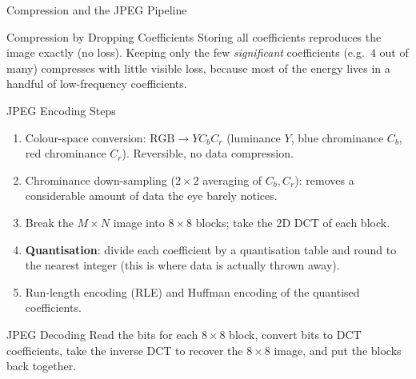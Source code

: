 \documentclass{beamer}
\begin{document}
\begin{frame}[shrink=10]{Compression and the JPEG Pipeline}
  \begin{block}{Compression by Dropping Coefficients}
    Storing all coefficients reproduces the image exactly (no loss). Keeping
    only the few \emph{significant} coefficients (e.g.\ $4$ out of many)
    compresses with little visible loss, because most of the energy lives in
    a handful of low-frequency coefficients.
  \end{block}

  \begin{block}{JPEG Encoding Steps}
    \begin{enumerate}\setlength\itemsep{2pt}
      \item Colour-space conversion: $\text{RGB} \to Y C_b C_r$
            (luminance $Y$, blue chrominance $C_b$, red chrominance $C_r$).
            Reversible, no data compression.
      \item Chrominance down-sampling ($2\times2$ averaging of $C_b, C_r$):
            removes a considerable amount of data the eye barely notices.
      \item Break the $M\times N$ image into $8\times8$ blocks; take the 2D
            DCT of each block.
      \item \textbf{Quantisation}: divide each coefficient by a quantisation
            table and round to the nearest integer (this is where data is
            actually thrown away).
      \item Run-length encoding (RLE) and Huffman encoding of the
            quantised coefficients.
    \end{enumerate}
  \end{block}

  \begin{exampleblock}{JPEG Decoding}
    Read the bits for each $8\times8$ block, convert bits to DCT
    coefficients, take the inverse DCT to recover the $8\times8$ image, and
    put the blocks back together.
  \end{exampleblock}
\end{frame}
\end{document}
